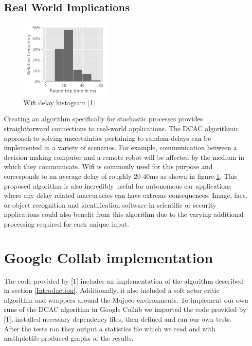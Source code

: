 \documentclass{article} %
\begin{document}
\subsection{Real World Implications}

\begin{figure}[H]
\begin{center}
\includegraphics[scale=1]{images/wifilatency.png}
\end{center}
\caption{Wifi delay histogram  [1]}
\label{wifiHistogram}
\end{figure}

Creating an algorithm specifically for stochastic processes provides straightforward connections to real-world applications. The DCAC algorithmic approach to solving uncertainties pertaining to random delays can be implemented in a variety of scenarios. For example, communication between a decision making computer and a remote robot will be affected by the medium in which they communicate. Wifi is commonly used for this purpose and corresponds to an average delay of roughly 20-40ms as shown in figure \ref{wifiHistogram}. This proposed algorithm is also incredibly useful for autonomous car applications where any delay related inaccuracies can have extreme consequences. Image, face, or object recognition and identification software in scientific or security applications could also benefit from this algorithm due to the varying additional processing required for each unique input.

\section{Google Collab implementation}

The code provided by [1] includes an implementation of the algorithm described 
in section \ref{Introduction}.
Additionally, it also included a soft actor critic algorithm and wrappers around
the Mujoco environments. 
To implement our own runs of the DCAC algorithm in Google Collab we imported the code provided by [1],
installed necessary dependency files, then defined and ran our own tests.
After the tests ran they output a statistics file which we read and with mathplotlib produced graphs of the results.
\end{document}
